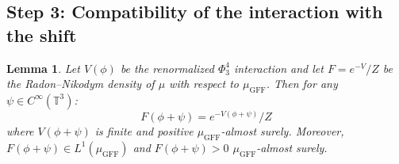 \documentclass[12pt]{article}
\newtheorem{lemma}[theorem]{Lemma}
\begin{document}
\subsection{Step 3: Compatibility of the interaction with the shift}

\begin{lemma}\label{lem:interaction}
Let $V(\phi)$ be the renormalized $\Phi^4_3$ interaction and let $F = e^{-V}/Z$ be the Radon--Nikodym density of $\mu$ with respect to $\mu_{\mathrm{GFF}}$. Then for any $\psi \in C^\infty(\mathbb{T}^3)$:
\begin{equation}\label{eq:shifted-F}
F(\phi + \psi) = e^{-V(\phi + \psi)}/Z
\end{equation}
where $V(\phi + \psi)$ is finite and positive $\mu_{\mathrm{GFF}}$-almost surely. Moreover, $F(\phi + \psi) \in L^1(\mu_{\mathrm{GFF}})$ and $F(\phi + \psi) > 0$ $\mu_{\mathrm{GFF}}$-almost surely.
\end{lemma}
\end{document}
